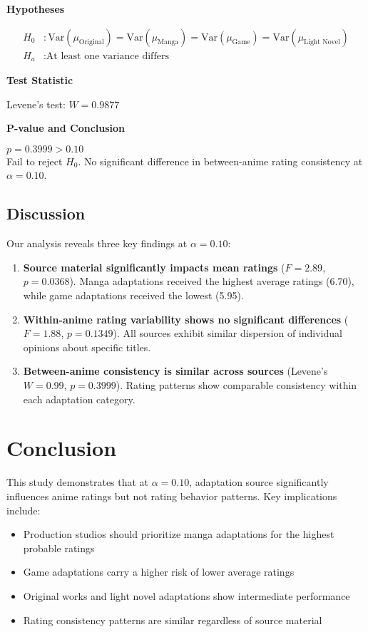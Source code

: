 \documentclass{article}
\begin{document}
\begin{CJK*}{UTF8}{gbsn}
\textbf{Hypotheses}

\begin{align*}
H_0&: \text{Var}(\mu_{\text{Original}}) = \text{Var}(\mu_{\text{Manga}}) = \text{Var}(\mu_{\text{Game}}) = \text{Var}(\mu_{\text{Light Novel}}) \\
H_a&: \text{At least one variance differs}
\end{align*}

\textbf{Test Statistic}

Levene's test: $W = 0.9877$

\textbf{P-value and Conclusion}

$p = 0.3999 > 0.10$ \\
Fail to reject $H_0$. No significant difference in between-anime rating consistency at $\alpha = 0.10$.


\subsection{Discussion}
Our analysis reveals three key findings at $\alpha = 0.10$:
\begin{enumerate}
    \item \textbf{Source material significantly impacts mean ratings} ($F=2.89$, $p=0.0368$). Manga adaptations received the highest average ratings (6.70), while game adaptations received the lowest (5.95).
    
    \item \textbf{Within-anime rating variability shows no significant differences} ($F=1.88$, $p=0.1349$). All sources exhibit similar dispersion of individual opinions about specific titles.
    
    \item \textbf{Between-anime consistency is similar across sources} (Levene's $W=0.99$, $p=0.3999$). Rating patterns show comparable consistency within each adaptation category.
\end{enumerate}

\section{Conclusion}
This study demonstrates that at $\alpha = 0.10$, adaptation source significantly influences anime ratings but not rating behavior patterns. Key implications include:
\begin{itemize}
    \item Production studios should prioritize manga adaptations for the highest probable ratings
    \item Game adaptations carry a higher risk of lower average ratings
    \item Original works and light novel adaptations show intermediate performance
    \item Rating consistency patterns are similar regardless of source material
\end{itemize}


\end{CJK*}
\end{document}
